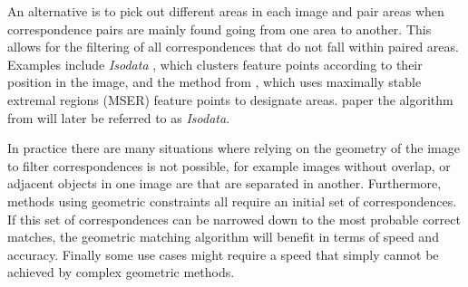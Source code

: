 \documentclass[conference]{IEEEtran}
\begin{document}
%
An alternative is to pick out different areas in each image and pair 
areas when correspondence pairs are mainly found going from one area to 
another. This allows for the filtering of all correspondences that do 
not fall within paired areas. Examples include \emph{Isodata} 
\cite{das2008event}, which clusters feature points according to their 
position in the image,
and the method from \cite{wu2011robust}, which uses maximally stable 
extremal regions (MSER) feature points to designate areas. %
paper the algorithm from \cite{das2008event} will later be referred to 
as \emph{Isodata}.


In practice there are many situations where relying on the geometry of the 
image to filter correspondences is not possible, for example images without overlap, or adjacent objects in one image are that are separated in 
another.  %
Furthermore, methods using geometric constraints all require an initial 
set of correspondences. If this set of correspondences can be narrowed down 
to the most probable correct matches, the geometric matching algorithm will benefit in terms of speed and accuracy. 
Finally some use cases might require a speed that simply cannot be achieved by 
complex geometric methods.%
\end{document}
